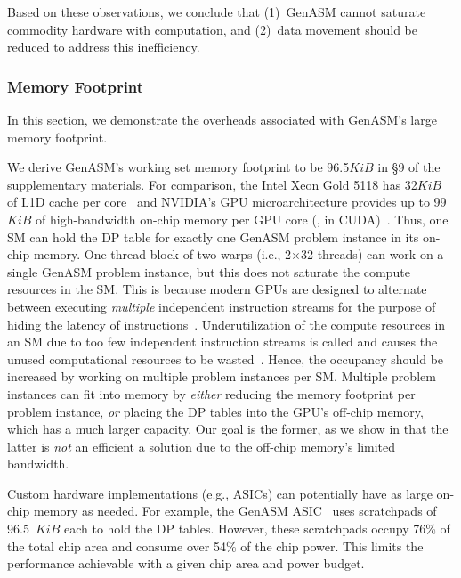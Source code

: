 Based on these observations, we conclude that (1)~GenASM cannot saturate commodity hardware with computation, and (2)~data movement should be reduced to address this inefficiency.

\subsubsection{Memory Footprint} \label{sec:memory_footprint}
In this section, we demonstrate the overheads associated with GenASM's large memory footprint.%

We derive GenASM's working set memory footprint to be 96.5$KiB$ in \S9 of the supplementary materials. For comparison, the Intel Xeon Gold 5118 has 32$KiB$ of L1D cache per core~\citep{xeon_gold_5118} and NVIDIA's  GPU microarchitecture provides up to 99$KiB$ of high-bandwidth on-chip memory per GPU core (,  in CUDA)~\citep{cuda_guide}. Thus, one SM can hold the DP table for exactly one GenASM problem instance in its on-chip memory. One thread block of two warps (i.e., 2$\times$32 threads) can work on a single GenASM problem instance, but this does not saturate the compute resources in the SM. This is because modern GPUs are designed to alternate between executing \emph{multiple} independent instruction streams for the purpose of hiding the latency of instructions~\citep{lindholm2008nvidia}. Underutilization of the compute resources in an SM due to too few independent instruction streams is called  and causes the unused computational resources to be wasted~\citep{cuda_guide}. Hence, the occupancy should be increased by working on multiple problem instances per SM. Multiple problem instances can fit into memory by \emph{either} reducing the memory footprint per problem instance, \emph{or} placing the DP tables into the GPU's off-chip memory, which has a much larger capacity. Our goal is the former, as we show in  that the latter is \emph{not} an efficient a solution due to the off-chip memory's limited bandwidth.

Custom hardware implementations (e.g., ASICs) can potentially have as large on-chip memory as needed. For example, the GenASM ASIC~\citep{cali2020genasm} uses scratchpads of 96.5~$KiB$ each to hold the DP tables. However, these scratchpads occupy 76\% of the total chip area and consume over 54\% of the chip power. This limits the performance achievable with a given chip area and power budget.

